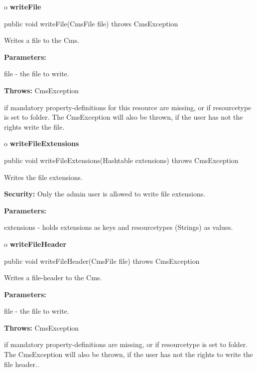 o {\bf writeFile} 

\begin{PRE}
 public void writeFile(CmsFile file) throws CmsException
\end{PRE}

\begin{description}
\htmlDD Writes a file to the Cms. 

\begin{description}
\item {\bf Parameters:}  

file - the file to write.  
\item {\bf Throws:} CmsException  

if mandatory property-definitions for this resource are missing, or if
resourcetype is set to folder. The CmsException will also be thrown, if the
user has not the rights write the file.  
\end{description}

\end{description}

o {\bf writeFileExtensions} 

\begin{PRE}
 public void writeFileExtensions(Hashtable extensions) throws CmsException
\end{PRE}

\begin{description}
\htmlDD Writes the file extensions. 

{\bf Security:} Only the admin user is allowed to write file extensions. 

\begin{description}
\item {\bf Parameters:}  

extensions - holds extensions as keys and resourcetypes (Strings) as values.  
\end{description}

\end{description}

o {\bf writeFileHeader} 

\begin{PRE}
 public void writeFileHeader(CmsFile file) throws CmsException
\end{PRE}

\begin{description}
\htmlDD Writes a file-header to the Cms. 

\begin{description}
\item {\bf Parameters:}  

file - the file to write.  
\item {\bf Throws:} CmsException  

if mandatory property-definitions are missing, or if resourcetype is set to
folder. The CmsException will also be thrown, if the user has not the rights
to write the file header..  
\end{description}

\end{description}

